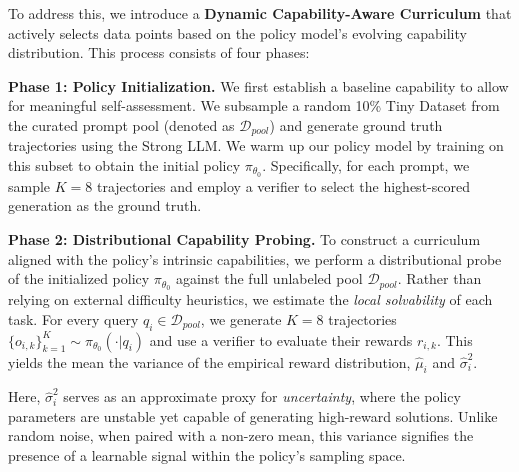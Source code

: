 \documentclass{article} %
\begin{document}
To address this, we introduce a \textbf{Dynamic Capability-Aware Curriculum} that actively selects data points based on the policy model's evolving capability distribution. This process consists of four phases:

\textbf{Phase 1: Policy Initialization.} 
We first establish a baseline capability to allow for meaningful self-assessment. We subsample a random 10\% Tiny Dataset from the curated prompt pool (denoted as $\mathcal{D}_{pool}$) and generate ground truth trajectories using the Strong LLM. We warm up our policy model by training on this subset to obtain the initial policy $\pi_{\theta_{0}}$. Specifically, for each prompt, we sample $K=8$ trajectories and employ a verifier to select the highest-scored generation as the ground truth.

\textbf{Phase 2: Distributional Capability Probing.} 
To construct a curriculum aligned with the policy's intrinsic capabilities, we perform a distributional probe of the initialized policy $\pi_{\theta_{0}}$ against the full unlabeled pool $\mathcal{D}_{pool}$. Rather than relying on external difficulty heuristics, we estimate the \textit{local solvability} of each task. For every query $q_i \in \mathcal{D}_{pool}$, we generate $K=8$ trajectories $\{o_{i,k}\}_{k=1}^K \sim \pi_{\theta_{0}}(\cdot|q_i)$ and use a verifier to evaluate their rewards $r_{i,k}$. This yields the mean the variance of the empirical reward distribution, $\hat{\mu}_i$ and $\hat{\sigma}^2_i$.

Here, $\hat{\sigma}^2_i$ serves as an approximate proxy for \textit{uncertainty}, where the policy parameters are unstable yet capable of generating high-reward solutions. Unlike random noise, when paired with a non-zero mean, this variance signifies the presence of a learnable signal within the policy's sampling space.
\end{document}
